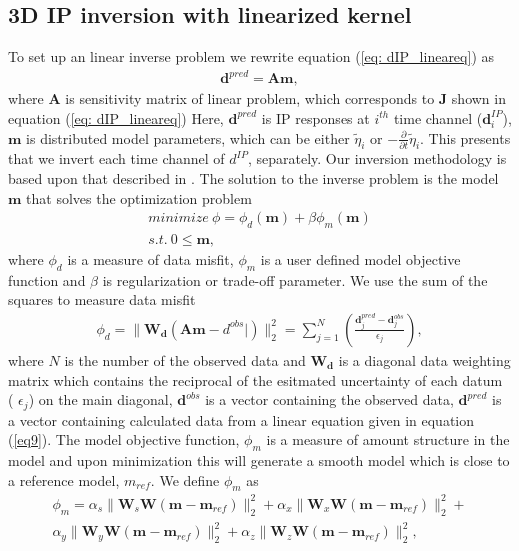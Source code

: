 \documentclass[a4paper, 11pt]{article}
\newcommand{\peta}{\tilde{\eta}}
\begin{document}
\subsection{3D IP inversion with linearized kernel}
To set up an linear inverse problem we rewrite equation (\ref{eq: dIP_lineareq}) as
\begin{eqnarray}
  \mathbf{d}^{pred} = \mathbf{A}\mathbf{m},
  \label{eq9}
\end{eqnarray}
where $\mathbf{A}$ is sensitivity matrix of linear problem, which corresponds to $\mathbf{J}$ shown in equation (\ref{eq: dIP_lineareq}) 
Here, $\mathbf{d}^{pred}$ is IP responses at $i^{th}$ time channel ($\mathbf{d}^{IP}_i$), $\mathbf{m}$ is distributed model parameters, which can be either $\peta_{i}$ or $-\frac{\partial}{\partial t}\peta_{i}$. 
This presents that we invert each time channel of $d^{IP}$, separately. 
Our inversion methodology is based upon that described in \cite{doug1994}. The solution to the inverse problem is the model $\mathbf{m}$ that solves the optimization problem
\begin{eqnarray}
  minimize \ \phi =  \phi_d(\mathbf{m}) + \beta\phi_m(\mathbf{m})\nonumber \\
  s.t. \ 0 \le \mathbf{m},
  \label{eq10}
\end{eqnarray}
where $\phi_d$ is a measure of data misfit, $\phi_m$ is a user defined model objective function and $\beta$ is regularization or trade-off parameter. 
We use the sum of the squares to measure data misfit
\begin{eqnarray}
  \phi_d = \| \mathbf{W_d}(\mathbf{A}\mathbf{m}-d^{obs}|)\|^2_2 =
  \sum^N_{j=1}(\frac{\mathbf{d}^{pred}_j-\mathbf{d}^{obs}_j}{\epsilon_j}),
  \label{eq11}
\end{eqnarray}
where $N$ is the number of the observed data and $\mathbf{W_d}$ is a diagonal data weighting matrix which contains the reciprocal of the esitmated uncertainty of each datum (
$\epsilon_j$) on the main diagonal,  $\mathbf{d}^{obs}$ is a vector containing the observed data, $\mathbf{d}^{pred}$ is a vector containing calculated data from a linear equation given in equation (\ref{eq9}).
The model objective function, $\phi_m$ is a measure of amount structure in the model and upon minimization this will generate a smooth model which is close to a reference model, $m_{ref}$. 
We define $\phi_m$ as
\begin{eqnarray}
  \phi_m = \alpha_s\| \mathbf{W}_s\mathbf{W}(\mathbf{m}-\mathbf{m}_{ref})\|^2_2+
       \alpha_x\| \mathbf{W}_x\mathbf{W}(\mathbf{m}-\mathbf{m}_{ref})\|^2_2+ \nonumber \\
       \alpha_y\| \mathbf{W}_y\mathbf{W}(\mathbf{m}-\mathbf{m}_{ref})\|^2_2+
       \alpha_z\| \mathbf{W}_z\mathbf{W}(\mathbf{m}-\mathbf{m}_{ref})\|^2_2,
  \label{eq12}
\end{eqnarray}
\end{document}

